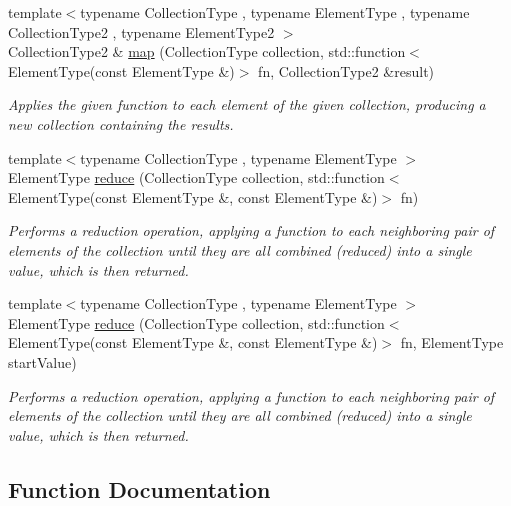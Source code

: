 \begin{DoxyCompactItemize}
{\footnotesize template$<$typename Collection\+Type , typename Element\+Type , typename Collection\+Type2 , typename Element\+Type2 $>$ }\\Collection\+Type2 \& \mbox{\hyperlink{namespacefunctional_a51165ce4b506c99325632c62390ea71d}{map}} (Collection\+Type collection, std\+::function$<$ Element\+Type(const Element\+Type \&)$>$ fn, Collection\+Type2 \&result)
\begin{DoxyCompactList}\small\item\em Applies the given function to each element of the given collection, producing a new collection containing the results. \end{DoxyCompactList}\item 
{\footnotesize template$<$typename Collection\+Type , typename Element\+Type $>$ }\\Element\+Type \mbox{\hyperlink{namespacefunctional_af6242058989d7f1416afaf20fb503c2c}{reduce}} (Collection\+Type collection, std\+::function$<$ Element\+Type(const Element\+Type \&, const Element\+Type \&)$>$ fn)
\begin{DoxyCompactList}\small\item\em Performs a reduction operation, applying a function to each neighboring pair of elements of the collection until they are all combined (reduced) into a single value, which is then returned. \end{DoxyCompactList}\item 
{\footnotesize template$<$typename Collection\+Type , typename Element\+Type $>$ }\\Element\+Type \mbox{\hyperlink{namespacefunctional_a224d4a051c11150b90638e511dad2a6b}{reduce}} (Collection\+Type collection, std\+::function$<$ Element\+Type(const Element\+Type \&, const Element\+Type \&)$>$ fn, Element\+Type start\+Value)
\begin{DoxyCompactList}\small\item\em Performs a reduction operation, applying a function to each neighboring pair of elements of the collection until they are all combined (reduced) into a single value, which is then returned. \end{DoxyCompactList}\end{DoxyCompactItemize}


\subsection{Function Documentation}
\mbox{\label{namespacefunctional_ae3bb7f21cd2f266a98d6ca42bea725bc}} 
